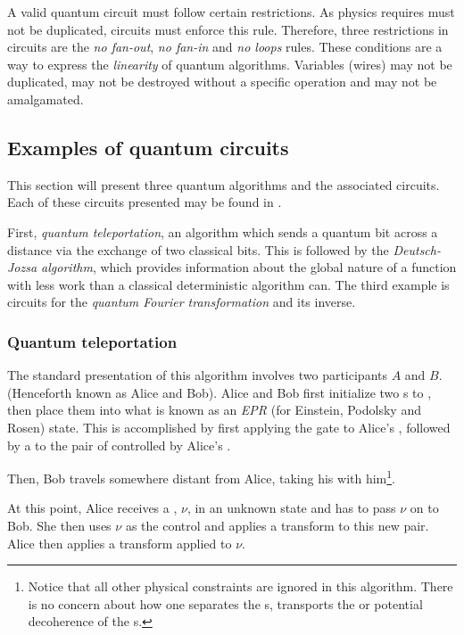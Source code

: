 A valid quantum circuit must follow certain restrictions. As physics requires
\qubits{} must not be duplicated, circuits must enforce this rule.
 Therefore, three restrictions in circuits are the \emph{no fan-out},
\emph{no fan-in} and \emph{no loops} rules. These conditions are  a
way to express the \emph{linearity} of quantum algorithms. Variables (wires)
may not be duplicated, may not be destroyed without a specific
operation and may not be amalgamated.


\subsection{Examples of quantum circuits}\label{subsec:exampleQuantumCircuits}
This section will present three quantum algorithms
and the associated circuits.
Each of these circuits presented may be found  in \cite{neilsen2000:QuantumComputationAndInfo}.

First, \emph{quantum teleportation}, an algorithm which sends a quantum bit
 across a distance via the exchange of two classical bits. This is
followed by the \emph{Deutsch-Jozsa algorithm},
which provides information about the
global nature of a function with less work than a classical deterministic
algorithm can. The third example is  circuits for the
\emph{quantum Fourier transformation} and its inverse.

\subsubsection{Quantum teleportation}\label{subsubsec:quantumTeleportation}
The standard presentation of this algorithm involves two
participants $A$ and $B$.
(Henceforth known as Alice and Bob). Alice and Bob first
initialize two \qubit{}s
to , then place them into what is known
 as an \emph{EPR} (for Einstein,
Podolsky and Rosen) state. This is accomplished by first applying the \Had{}
gate to Alice's \qubit{}, followed by a \Cnot{} to the pair of \qubits{}
 controlled
by Alice's \qubit{}.

Then, Bob travels somewhere distant from Alice, taking his \qubit{} with
him\footnote{Notice that all other physical constraints are ignored in this
algorithm. There is no concern about how one separates the \qubit{}s, transports
the \qubit{} or potential decoherence of the \qubit{}s.}.

At this point,  Alice receives a
 \qubit{}, $\nu$,  in an unknown state and has to  pass $\nu$
 on to Bob. She then uses $\nu$ as  the control and applies a
{\Cnot{}} transform to this new pair. Alice then applies a \Had{}
transform applied to $\nu$.

